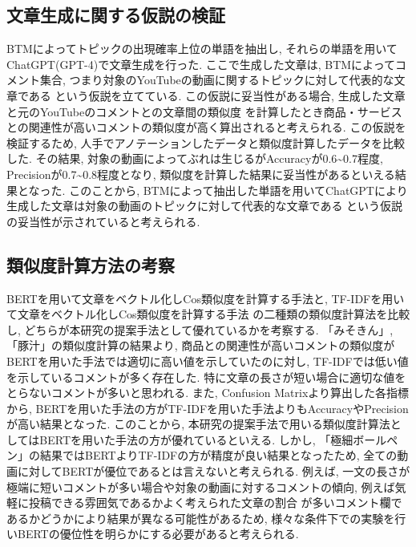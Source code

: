 \documentclass{ltjarticle}
\begin{document}
\subsection{文章生成に関する仮説の検証}
BTMによってトピックの出現確率上位の単語を抽出し, それらの単語を用いてChatGPT(GPT-4)で文章生成を行った. 
ここで生成した文章は, BTMによってコメント集合, つまり対象のYouTubeの動画に関するトピックに対して代表的な文章である
という仮説を立てている. この仮説に妥当性がある場合, 生成した文章と元のYouTubeのコメントとの文章間の類似度
を計算したとき商品・サービスとの関連性が高いコメントの類似度が高く算出されると考えられる. 
この仮説を検証するため, 人手でアノテーションしたデータと類似度計算したデータを比較した. 
その結果, 対象の動画によってぶれは生じるがAccuracyが0.6\sim0.7程度, Precisionが0.7\sim0.8程度となり, 
類似度を計算した結果に妥当性があるといえる結果となった. 
このことから, BTMによって抽出した単語を用いてChatGPTにより生成した文章は対象の動画のトピックに対して代表的な文章である
という仮説の妥当性が示されていると考えられる. 

\subsection{類似度計算方法の考察}
BERTを用いて文章をベクトル化しCos類似度を計算する手法と, TF-IDFを用いて文章をベクトル化しCos類似度を計算する手法
の二種類の類似度計算法を比較し, どちらが本研究の提案手法として優れているかを考察する. 
「みそきん」, 「豚汁」の類似度計算の結果より, 商品との関連性が高いコメントの類似度がBERTを用いた手法では適切に高い値を示していたのに対し, 
TF-IDFでは低い値を示しているコメントが多く存在した. 特に文章の長さが短い場合に適切な値をとらないコメントが多いと思われる. 
また, Confusion Matrixより算出した各指標から, BERTを用いた手法の方がTF-IDFを用いた手法よりもAccuracyやPrecision
が高い結果となった. このことから, 本研究の提案手法で用いる類似度計算法としてはBERTを用いた手法の方が優れているといえる. 
しかし, 「極細ボールペン」の結果ではBERTよりTF-IDFの方が精度が良い結果となったため, 全ての動画に対してBERTが優位であるとは言えないと考えられる. 
例えば, 一文の長さが極端に短いコメントが多い場合や対象の動画に対するコメントの傾向, 例えば気軽に投稿できる雰囲気であるかよく考えられた文章の割合
が多いコメント欄であるかどうかにより結果が異なる可能性があるため, 様々な条件下での実験を行いBERTの優位性を明らかにする必要があると考えられる. 
\end{document}
